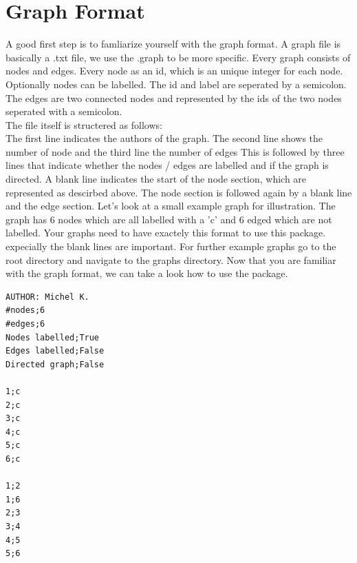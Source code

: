 \documentclass{SeminarV2}
\begin{document}
\section{Graph Format}

A good first step is to famliarize yourself with the graph format. A graph
file is basically a .txt file, we use the .graph to be more specific.
Every graph consists of nodes and edges. Every node as an id, which is an unique
integer for each node. Optionally nodes can be labelled. The id and label are
seperated by a semicolon. The edges are two connected nodes and represented
by the ids of the two nodes seperated with a semicolon.\\
The file itself is structered as follows: \\
The first line indicates the authors of the graph. The second line shows the number
of node and the third line the number of edges
This is followed by three lines
that indicate whether the nodes / edges are labelled and if the graph is directed.
A blank line indicates the start of the node section, which are represented as
descirbed above. The node section is followed again by a blank line and the edge section.
Let's look at a small example graph for illustration. The graph has 6 nodes
which are all labelled with a 'c' and 6 edged which are not labelled.
Your graphs need to have exactely this format to use this package. expecially
the blank lines are important. For further example graphs go to the root
directory and navigate to the graphs directory. Now that you are familiar with
the graph format, we can take a look how to use the package.
\begin{verbatim}
AUTHOR: Michel K.
#nodes;6
#edges;6
Nodes labelled;True
Edges labelled;False
Directed graph;False

1;c
2;c
3;c
4;c
5;c
6;c

1;2
1;6
2;3
3;4
4;5
5;6
\end{verbatim}
\end{document}
